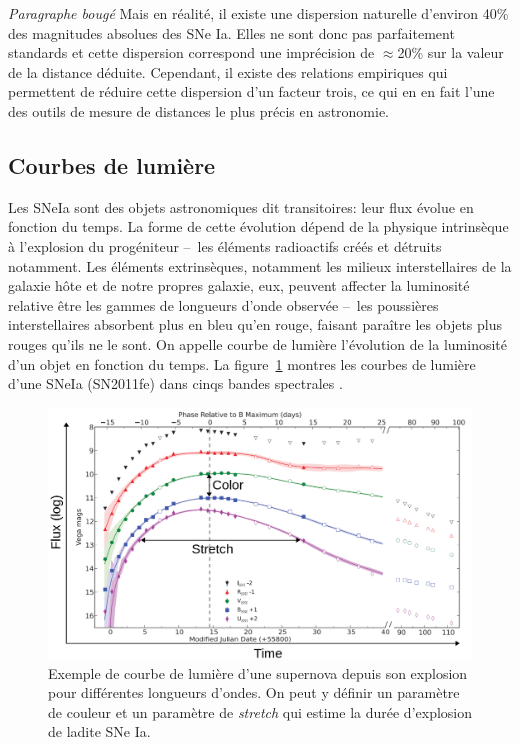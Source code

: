 \documentclass[a4paper, 12pt, svgnames]{article}
\newcommand{\mr}[1]{{\textcolor[rgb]{0.80,0.10,0.1}{#1}}}
\begin{document}
\mr{\textit{Paragraphe bougé}} Mais en réalité, il existe une dispersion
naturelle d'environ 40\% des magnitudes absolues des SNe Ia. Elles ne sont donc
pas parfaitement standards et cette dispersion \mr{correspond une imprécision de
$\approx$20\% sur la valeur de la distance déduite. Cependant, il existe des
relations empiriques qui permettent de réduire cette dispersion d'un facteur
trois, ce qui en en fait l'une des outils de mesure de distances le plus précis
en astronomie.}

\subsection{Courbes de lumière}\label{ssec:lc}

\mr{Les SNeIa sont des objets astronomiques dit transitoires: leur flux évolue
en fonction du temps. La forme de cette évolution dépend de la physique
intrinsèque à l'explosion du progéniteur --~les éléments radioactifs créés et
détruits notamment. Les éléments extrinsèques, notamment les milieux
interstellaires de la galaxie hôte et de notre propres galaxie, eux, peuvent
affecter la luminosité relative être les gammes de longueurs d'onde observée
--~les poussières interstellaires absorbent plus en bleu qu'en rouge, faisant
paraître les objets plus rouges qu'ils ne le sont. On appelle courbe de lumière
l'évolution de la luminosité d'un objet en fonction du temps. La
figure~\ref{fig:lightcurves} montres les courbes de lumière d'une SNeIa
(SN2011fe) dans cinqs bandes spectrales \cite{pereira_spectrophotometric_2013}.}

\begin{figure}[htbp!]
    \centering
    \includegraphics[width=.5\linewidth]{Rapport_figures/lightcurve.png}
    \captionsetup{justification=centering}
    \caption{Exemple de courbe de lumière d'une supernova depuis son explosion
    pour différentes longueurs d'ondes. On peut y définir un paramètre de
couleur et un paramètre de \textit{stretch} qui estime la durée d'explosion de
ladite SNe Ia.}
    \label{fig:lightcurves}
\end{figure}
\end{document}
